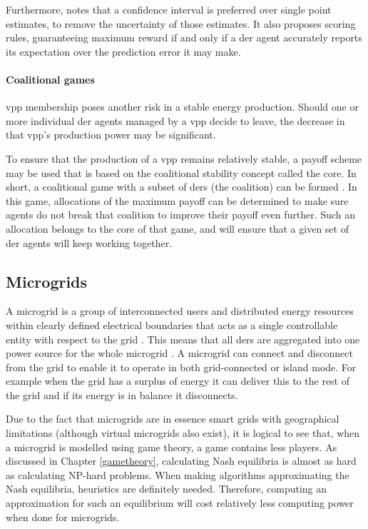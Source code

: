 Furthermore, \cite{RobuKotaChalkiadakisEtAl2012} notes that a confidence interval is preferred over single point estimates, to remove the uncertainty of those estimates. It also proposes scoring rules, guaranteeing maximum reward if and only if a \ac{der} agent accurately reports its expectation over the prediction error it may make.  

\paragraph{Coalitional games}
\label{vpp:coalition}
\ac{vpp} membership poses another risk in a stable energy production. Should one or more individual \ac{der} agents managed by a \ac{vpp} decide to leave, the decrease in that \ac{vpp}'s production power may be significant. 

To ensure that the production of a \ac{vpp} remains relatively stable, a payoff scheme may be used that is based on the coalitional stability concept called the core. In short, a coalitional game with a subset of \acp{der} (the coalition) can be formed \cite{MihailescuVasiraniOssowski2011}. In this game, allocations of the maximum payoff can be determined to make sure agents do not break that coalition to improve their payoff even further\cite{ChalkiadakisRobuKotaEtAl2011, YeungPoonWu1999, SaadHanPoor2011}. Such an allocation belongs to the core of that game, and will ensure that a given set of \ac{der} agents will keep working together.

\subsection{Microgrids}
A microgrid is a group of interconnected users and distributed energy resources within clearly defined electrical boundaries that acts as a single controllable entity with respect to the grid . This means that all \acp{der} are aggregated into one power source for the whole microgrid \cite{KanchevLuColasEtAl2011}. A microgrid can connect and disconnect from the grid to enable it to operate in both grid-connected or island mode. For example when the grid has a surplus of energy it can deliver this to the rest of the grid and if its energy is in balance it disconnects. 

Due to the fact that microgrids are in essence smart grids with geographical limitations (although virtual microgrids also exist), it is logical to see that, when a microgrid is modelled using game theory, a game contains less players. As discussed in Chapter \ref{gametheory}, calculating Nash equilibria is almost as hard as calculating NP-hard problems. When making algorithms approximating the Nash equilibria, heuristics are definitely needed. Therefore, computing an approximation for such an equilibrium will cost relatively less computing power when done for microgrids. 

